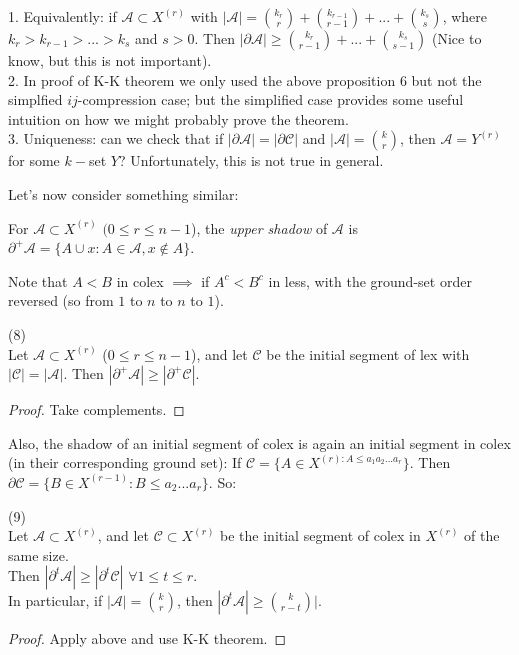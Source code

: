 \documentclass[a4paper]{article}
\begin{document}
\begin{rem}
    1. Equivalently: if $\mathcal{A} \subset X^{(r)}$ with $|\mathcal{A}| = {k_r \choose r} + {k_{r-1} \choose {r-1}} + ... + {k_s \choose s}$, where $k_r>k_{r-1}>...>k_s$ and $s>0$. Then $|\partial \mathcal{A}| \geq {k_r \choose {r-1}} + ... +{k_s \choose {s-1}}$ (Nice to know, but this is not important).\\
    2. In proof of K-K theorem we only used the above proposition 6 but not the simplfied $ij$-compression case; but the simplified case provides some useful intuition on how we might probably prove the theorem.\\
    3. Uniqueness: can we check that if $|\partial \mathcal{A}| = |\partial \mathcal{C}|$ and $|\mathcal{A}| = {k \choose r}$, then $\mathcal{A} = Y^{(r)}$for some $k-$set $Y$? Unfortunately, this is not true in general.
\end{rem}

Let's now consider something similar:

\begin{defi}
    For $\mathcal{A} \subset X^{(r)}$ $(0 \leq r \leq n-1$), the \emph{upper shadow} of $\mathcal{A}$ is $\partial^+ \mathcal{A} = \{A \cup x: A \in \mathcal{A}, x \not\in A\}$.\\
\end{defi}

Note that $A<B$ in colex $\implies$ if $A^c < B^c$ in less, with the ground-set order reversed (so from $1$ to $n$ to $n$ to $1$).

\begin{coro} (8)\\
    Let $\mathcal{A} \subset X^{(r)}$ ($0 \leq r \leq n-1$), and let $\mathcal{C}$ be the initial segment of lex with $|\mathcal{C}| = |\mathcal{A}|$. Then $|\partial^+ \mathcal{A}| \geq |\partial^+ \mathcal{C}|$.\\
    \begin{proof}
        Take complements.
    \end{proof}
\end{coro}

Also, the shadow of an initial segment of colex is again an initial segment in colex (in their corresponding ground set): If $\mathcal{C} = \{A \in X^{(r): A \leq a_1a_2...a_r}\}$. Then $\partial \mathcal{C} = \{B \in X^{(r-1)}: B \leq a_2...a_r\}$. So:

\begin{coro} (9)\\
    Let $\mathcal{A} \subset X^{(r)}$, and let $\mathcal{C} \subset X^{(r)}$ be the initial segment of colex in $X^{(r)}$ of the same size.\\
    Then $|\partial^t \mathcal{A}| \geq |\partial^t \mathcal{C}|$ $\forall 1 \leq t \leq r$.\\
    In particular, if $|\mathcal{A}| = {k \choose r}$, then $|\partial^t \mathcal{A}| \geq {k \choose {r-t}}|$.
    \begin{proof}
        Apply above and use K-K theorem.
    \end{proof}
\end{coro}
\end{document}
